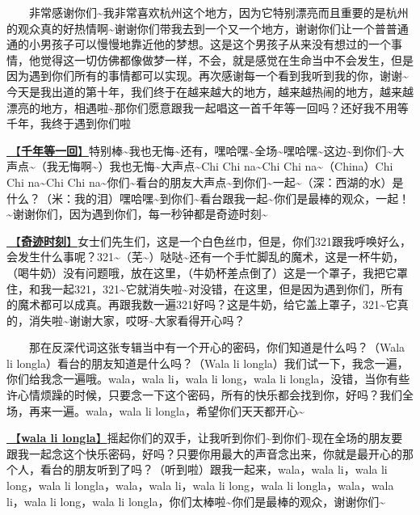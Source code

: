 \documentclass[]{ctexbook}
\begin{document}
  非常感谢你们\textasciitilde 我非常喜欢杭州这个地方，因为它特别漂亮而且重要的是杭州的观众真的好热情啊\textasciitilde 谢谢你们带我去到一个又一个地方，谢谢你们让一个普普通通的小男孩子可以慢慢地靠近他的梦想。这是这个男孩子从来没有想过的一个事情，他觉得这一切仿佛都像做梦一样，不会，就是感觉在生命当中不会发生，但是因为遇到你们所有的事情都可以实现。再次感谢每一个看到我听到我的你，谢谢\textasciitilde 今天是我出道的第十年，我们终于在越来越大的地方，越来越热闹的地方，越来越漂亮的地方，相遇啦\textasciitilde 那你们愿意跟我一起唱这一首千年等一回吗？还好我不用等千年，我终于遇到你们啦

\hyperref[once-in-1000]{🎵【\textbf{千年等一回}】}特别棒\textasciitilde 我也无悔\textasciitilde 还有，嘿哈嘿\textasciitilde 全场\textasciitilde 嘿哈嘿\textasciitilde 这边\textasciitilde 到你们\textasciitilde 大声点\textasciitilde（我无悔啊\textasciitilde）我也无悔\textasciitilde 大声点\textasciitilde Chi Chi na\textasciitilde Chi Chi na\textasciitilde（China）Chi Chi na\textasciitilde Chi Chi na\textasciitilde 你们\textasciitilde 看台的朋友大声点\textasciitilde 到你们\textasciitilde 一起\textasciitilde（深：西湖的水）是什么？（米：我的泪）嘿哈嘿\textasciitilde 到你们\textasciitilde 看台跟我一起\textasciitilde 你们是最棒的观众，一起！\textasciitilde 谢谢你们，因为遇到你们，每一秒钟都是奇迹时刻\textasciitilde{}

\hyperref[magic-moment]{🎵【\textbf{奇迹时刻}】}女士们先生们，这是一个白色丝巾，但是，你们321跟我呼唤好么，会发生什么事呢？321\textasciitilde（芜\textasciitilde）哒哒\textasciitilde 还有一个手忙脚乱的魔术，这是一杯牛奶，（喝牛奶）没有问题哦，放在这里，（牛奶杯差点倒了）这是一个罩子，我把它罩住，和我一起321，321\textasciitilde 它就消失啦\textasciitilde 对没错，在这里，但是因为遇到你们，所有的魔术都可以成真。再跟我数一遍321好吗？这是牛奶，给它盖上罩子，321\textasciitilde 它真的，消失啦\textasciitilde 谢谢大家，哎呀\textasciitilde 大家看得开心吗？

  那在反深代词这张专辑当中有一个开心的密码，你们知道是什么吗？（Wala li longla）看台的朋友知道是什么吗？（Wala li longla）我们试一下，我念一遍，你们给我念一遍哦。wala，wala li，wala li long，wala li longla，没错，当你有些许心情烦躁的时候，只要念一下这个密码，所有的快乐都会找到你，好吗？我们全场，再来一遍。wala，wala li longla，希望你们天天都开心\textasciitilde{}

\hyperref[wala-li-longla]{🎵【\textbf{wala li longla}】}摇起你们的双手，让我听到你们\textasciitilde 到你们\textasciitilde 现在全场的朋友要跟我一起念这个快乐密码，好吗？只要你用最大的声音念出来，你就是最开心的那个人，看台的朋友听到了吗？（听到啦）跟我一起来，wala，wala li，wala li long，wala li longla，wala，wala li，wala li long，wala li longla，wala，wala li，wala li long，wala li longla，你们太棒啦\textasciitilde 你们是最棒的观众，谢谢你们\textasciitilde{}
\end{document}
